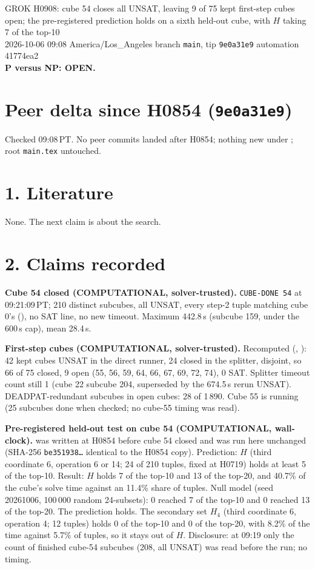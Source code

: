 \documentclass[11pt]{article}
\begin{document}
\sloppy
\begin{center}
{\Large GROK H0908: cube 54 closes all UNSAT, leaving 9 of 75 kept first-step cubes open; the pre-registered prediction holds on a sixth held-out cube, with $H$ taking 7 of the top-10}\\[4pt]
2026-10-06 09:08 America/Los\_Angeles \quad branch \texttt{main}, tip \texttt{9e0a31e9} \quad automation 41774ea2\\[2pt]
\textbf{P versus NP: OPEN.}
\end{center}

\section*{Peer delta since H0854 (\texttt{9e0a31e9})}
Checked 09:08\,PT. No peer commits landed after H0854; nothing new under ; root \texttt{main.tex} untouched.

\section*{1. Literature}
None. The next claim is about the search.

\section*{2. Claims recorded}
\textbf{Cube 54 closed (COMPUTATIONAL, solver-trusted).} \texttt{CUBE-DONE 54} at 09:21:09\,PT; 210 distinct subcubes, all UNSAT, every step-2 tuple matching cube 0's (), no SAT line, no new timeout. Maximum 442.8\,s (subcube 159, under the 600\,s cap), mean 28.4\,s.

\textbf{First-step cubes (COMPUTATIONAL, solver-trusted).} Recomputed (, ): 42 kept cubes UNSAT in the direct runner, 24 closed in the splitter, disjoint, so 66 of 75 closed, 9 open (55, 56, 59, 64, 66, 67, 69, 72, 74), 0 SAT. Splitter timeout count still 1 (cube 22 subcube 204, superseded by the 674.5\,s rerun UNSAT). DEADPAT-redundant subcubes in open cubes: 28 of 1\,890. Cube 55 is running (25 subcubes done when checked; no cube-55 timing was read).

\textbf{Pre-registered held-out test on cube 54 (COMPUTATIONAL, wall-clock).}  was written at H0854 before cube 54 closed and was run here unchanged (SHA-256 \texttt{be351938\ldots} identical to the H0854 copy). Prediction: $H$ (third coordinate 6, operation 6 or 14; 24 of 210 tuples, fixed at H0719) holds at least 5 of the top-10. Result: $H$ holds 7 of the top-10 and 13 of the top-20, and 40.7\% of the cube's solve time against an 11.4\% share of tuples. Null model (seed 20261006, 100\,000 random 24-subsets): 0 reached 7 of the top-10 and 0 reached 13 of the top-20. The prediction holds. The secondary set $H_4$ (third coordinate 6, operation 4; 12 tuples) holds 0 of the top-10 and 0 of the top-20, with 8.2\% of the time against 5.7\% of tuples, so it stays out of $H$. Disclosure: at 09:19 only the count of finished cube-54 subcubes (208, all UNSAT) was read before the run; no timing.
\end{document}
